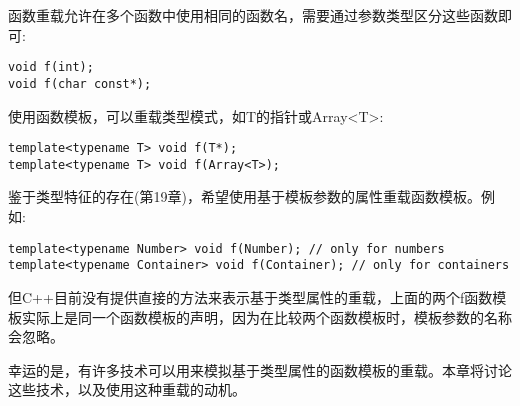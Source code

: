 
函数重载允许在多个函数中使用相同的函数名，需要通过参数类型区分这些函数即可:

\begin{lstlisting}[style=styleCXX]
void f(int);
void f(char const*);
\end{lstlisting}

使用函数模板，可以重载类型模式，如T的指针或Array<T>:

\begin{lstlisting}[style=styleCXX]
template<typename T> void f(T*);
template<typename T> void f(Array<T>);
\end{lstlisting}

鉴于类型特征的存在(第19章)，希望使用基于模板参数的属性重载函数模板。例如:

\begin{lstlisting}[style=styleCXX]
template<typename Number> void f(Number); // only for numbers
template<typename Container> void f(Container); // only for containers
\end{lstlisting}

但C++目前没有提供直接的方法来表示基于类型属性的重载，上面的两个f函数模板实际上是同一个函数模板的声明，因为在比较两个函数模板时，模板参数的名称会忽略。

幸运的是，有许多技术可以用来模拟基于类型属性的函数模板的重载。本章将讨论这些技术，以及使用这种重载的动机。






























